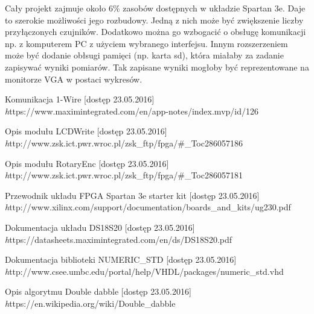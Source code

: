 \documentclass[a4paper]{article}
\begin{document}
Cały projekt zajmuje około 6\% zasobów dostępnych w układzie Spartan 3e. Daje to szerokie możliwości jego rozbudowy. Jedną z nich może być zwiększenie liczby przyłączonych czujników. Dodatkowo można go wzbogacić o obsługę komunikacji np. z komputerem PC z użyciem wybranego interfejsu. Innym rozszerzeniem może być dodanie obłsugi pamięci (np. karta sd), która miałaby za zadanie zapisywać wyniki pomiarów. Tak zapisane wyniki mogłoby być reprezentowane na monitorze VGA w postaci wykresów.

\newpage
{}
\begin{thebibliography}{9}
Komunikacja 1-Wire [dostęp 23.05.2016] \\
\emph  	https://www.maximintegrated.com/en/app-notes/index.mvp/id/126

Opis modułu LCDWrite [dostęp 23.05.2016] \\
\emph http://www.zsk.ict.pwr.wroc.pl/zsk\_ftp/fpga/\#\_Toc286057186

Opis modułu RotaryEnc [dostęp 23.05.2016] \\
\emph http://www.zsk.ict.pwr.wroc.pl/zsk\_ftp/fpga/\#\_Toc286057181

Przewodnik układu FPGA Spartan 3e starter kit [dostęp 23.05.2016] \\
\emph http://www.xilinx.com/support/documentation/boards\_and\_kits/ug230.pdf

Dokumentacja układu DS18S20 [dostęp 23.05.2016] \\
\emph https://datasheets.maximintegrated.com/en/ds/DS18S20.pdf

Dokumentacja biblioteki NUMERIC\_STD [dostęp 23.05.2016] \\
\emph http://www.csee.umbc.edu/portal/help/VHDL/packages/numeric\_std.vhd

Opis algorytmu Double dabble [dostęp 23.05.2016] \\
\emph https://en.wikipedia.org/wiki/Double\_dabble

\end{thebibliography}
\end{document}
